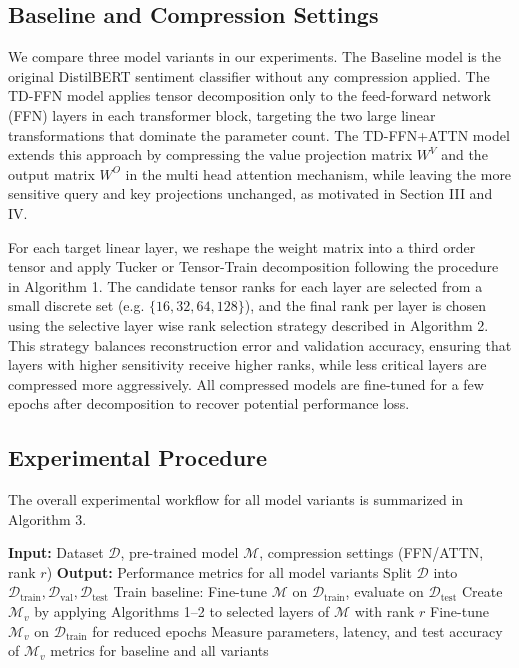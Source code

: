 \documentclass[conference]{IEEEtran}
\begin{document}
\subsection{Baseline and Compression Settings}
We compare three model variants in our experiments. The Baseline model is the original DistilBERT sentiment classifier
without any compression applied. The TD-FFN model applies tensor decomposition only to the feed-forward network (FFN)
layers in each transformer block, targeting the two large linear transformations that dominate the parameter count.
The TD-FFN+ATTN model extends this approach by compressing the value projection matrix $W^V$ and the output matrix $W^O$
in the multi head attention mechanism, while leaving the more sensitive query and key projections unchanged,
as motivated in Section III and IV.

For each target linear layer, we reshape the weight matrix into a third order tensor and apply Tucker or Tensor-Train
decomposition following the procedure in Algorithm 1. The candidate tensor ranks for each layer are selected from a small
discrete set (e.g. $\{16, 32, 64, 128\}$), and the final rank per layer is chosen using the selective layer wise rank
selection strategy described in Algorithm 2. This strategy balances reconstruction error and validation accuracy,
ensuring that layers with higher sensitivity receive higher ranks, while less critical layers are compressed
more aggressively. All compressed models are fine-tuned for a few epochs after decomposition to recover potential
performance loss.

\subsection{Experimental Procedure}
The overall experimental workflow for all model variants is summarized in Algorithm 3.

\begin{algorithm}[htbp]
\caption{End-to-End Experimental Procedure}
\label{alg:training-evaluation}
\begin{algorithmic}[1]
\STATE \textbf{Input:} Dataset $\mathcal{D}$, pre-trained model $\mathcal{M}$, compression settings (FFN/ATTN, rank $r$)
\STATE \textbf{Output:} Performance metrics for all model variants
\STATE
\STATE Split $\mathcal{D}$ into $\mathcal{D}_{\text{train}}, \mathcal{D}_{\text{val}}, \mathcal{D}_{\text{test}}$
\STATE
\STATE Train baseline: Fine-tune $\mathcal{M}$ on $\mathcal{D}_{\text{train}}$, evaluate on $\mathcal{D}_{\text{test}}$
\STATE
{}
    \STATE Create $\mathcal{M}_v$ by applying Algorithms 1--2 to selected layers of $\mathcal{M}$ with rank $r$
    \STATE Fine-tune $\mathcal{M}_v$ on $\mathcal{D}_{\text{train}}$ for reduced epochs
    \STATE Measure parameters, latency, and test accuracy of $\mathcal{M}_v$
\ENDFOR
\STATE
\RETURN metrics for baseline and all variants
\end{algorithmic}
\end{algorithm}
\end{document}
